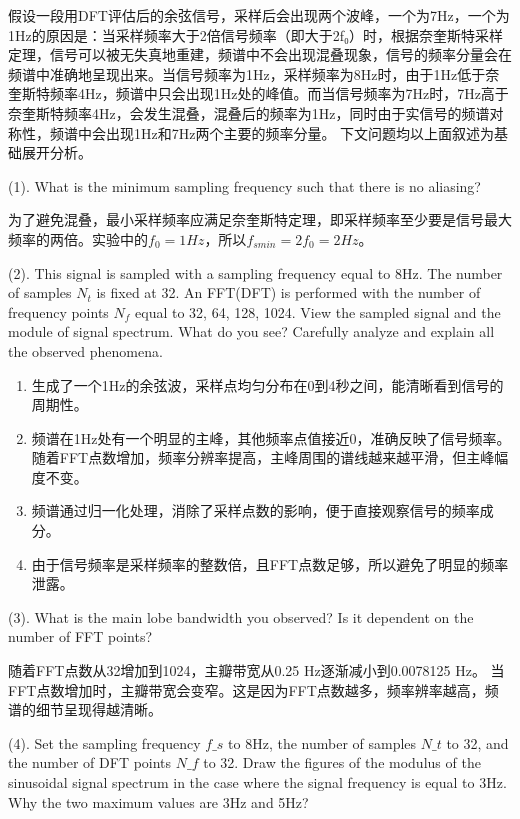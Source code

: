 \documentclass{article}
\begin{document}
假设一段用DFT评估后的余弦信号，采样后会出现两个波峰，一个为7Hz，一个为1Hz的原因是：当采样频率大于2倍信号频率（即大于2f₀）时，根据奈奎斯特采样定理，信号可以被无失真地重建，频谱中不会出现混叠现象，信号的频率分量会在频谱中准确地呈现出来。当信号频率为1Hz，采样频率为8Hz时，由于1Hz低于奈奎斯特频率4Hz，频谱中只会出现1Hz处的峰值。而当信号频率为7Hz时，7Hz高于奈奎斯特频率4Hz，会发生混叠，混叠后的频率为1Hz，同时由于实信号的频谱对称性，频谱中会出现1Hz和7Hz两个主要的频率分量。
下文问题均以上面叙述为基础展开分析。
\vspace{3em}


(1). What is the minimum sampling frequency such that there is no aliasing?

为了避免混叠，最小采样频率应满足奈奎斯特定理，即采样频率至少要是信号最大频率的两倍。实验中的\(f_0=1Hz\)，所以\(f_{smin}=2f_0=2Hz\)。
\vspace{3em}

(2). This signal is sampled with a sampling frequency equal to 8Hz. The number of samples \(N_t\) is fixed at 32. An FFT(DFT) is performed with the number of frequency points \(N_f\) equal to 32, 64, 128, 1024. View the sampled signal and the module of signal spectrum. What do you see? Carefully analyze and explain all the observed phenomena.
\begin{enumerate}
    \item 生成了一个1Hz的余弦波，采样点均匀分布在0到4秒之间，能清晰看到信号的周期性。
    \item 频谱在1Hz处有一个明显的主峰，其他频率点值接近0，准确反映了信号频率。
     随着FFT点数增加，频率分辨率提高，主峰周围的谱线越来越平滑，但主峰幅度不变。
    \item 频谱通过归一化处理，消除了采样点数的影响，便于直接观察信号的频率成分。
    \item 由于信号频率是采样频率的整数倍，且FFT点数足够，所以避免了明显的频率泄露。
\end{enumerate}

\vspace{3em}

(3). What is the main lobe bandwidth you observed? Is it dependent on the number of FFT points?\vspace{1em}

随着FFT点数从32增加到1024，主瓣带宽从0.25 Hz逐渐减小到0.0078125 Hz。
当FFT点数增加时，主瓣带宽会变窄。这是因为FFT点数越多，频率辨率越高，频谱的细节呈现得越清晰。
\vspace{3em}

(4). Set the sampling frequency $f\_s$ to 8Hz, the number of samples $N\_t$ to 32, and the number of DFT points $N\_f$ to 32. Draw the figures of the modulus of the sinusoidal signal spectrum in the case where the signal frequency is equal to 3Hz. Why the two maximum values are 3Hz and 5Hz?
\end{document}
